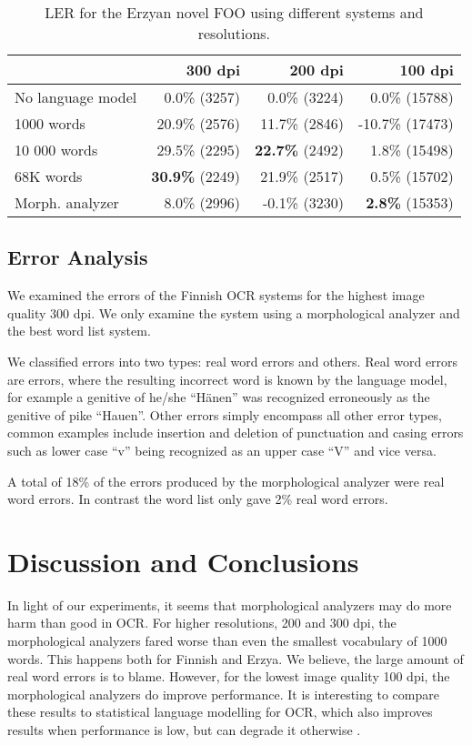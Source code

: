 \documentclass[b5paper]{article}
\begin{document}
\begin{table}[!htb]
\begin{center}
\begin{tabular}{lrrr}
\hline 
                  & 300 dpi & 200 dpi & 100 dpi \\
\hline 
No language model &  0.0\% (3257)  &  0.0\% (3224)  &  0.0\% (15788)  \\
1000 words        &  20.9\% (2576)  &  11.7\% (2846)  & -10.7\%  (17473) \\
10 000 words      &  29.5\% (2295)  &   {\bf 22.7\%} (2492)  & 1.8\% (15498)  \\
68K words         &  {\bf 30.9\%} (2249)  &  21.9\% (2517)  & 0.5\% (15702)\\
Morph. analyzer   &  8.0\% (2996)  &  -0.1\% (3230)  & {\bf 2.8\%} (15353)  \\
\hline 
\end{tabular}
\caption{LER for the Erzyan novel FOO using different systems and resolutions.}\label{myv-novel-res}
\end{center}
\end{table}

\subsection{Error Analysis}

We examined the errors of the Finnish OCR systems for the highest
image quality 300 dpi. We only examine the system using a morphological
analyzer and the best word list system.

We classified errors into two types: real word errors and others. Real
word errors are errors, where the resulting incorrect word is known by
the language model, for example a genitive of
he/she ``Hänen'' was recognized erroneously as the genitive
of pike ``Hauen''. Other errors simply encompass all other error
types, common examples include insertion and deletion of punctuation
and casing errors such as lower case ``v'' being recognized as an
upper case ``V'' and vice versa.

A total of 18\% of the errors produced by the morphological analyzer
were real word errors. In contrast the word list only gave 2\% real
word errors.

\section{Discussion and Conclusions}
\label{disc}

In light of our experiments, it seems that morphological analyzers may
do more harm than good in OCR. For higher resolutions, 200 and 300 dpi,
the morphological analyzers fared worse than even the smallest
vocabulary of 1000 words. This happens both for Finnish and Erzya. We
believe, the large amount of real word errors is to blame. However,
for the lowest image quality 100 dpi, the morphological analyzers do
improve performance. It is interesting to compare these results to
statistical language modelling for OCR, which also improves results
when performance is low, but can degrade it otherwise \cite{smith11}.
\end{document}

